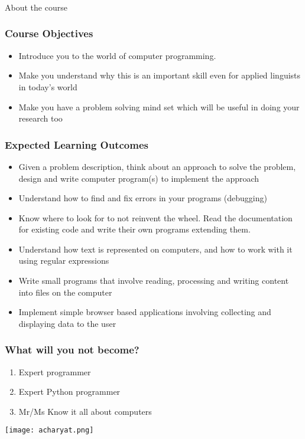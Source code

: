 \documentclass{beamer}
\begin{document}
\begin{frame}
\frametitle{}
\begin{center}
\Large About the course
\end{center}
\end{frame}

\begin{frame}
\frametitle{Course Objectives}
\begin{itemize}
\item Introduce you to the world of computer programming.
\item Make you understand why this is an important skill even for applied linguists in today's world
\item Make you have a problem solving mind set which will be useful in doing your research too
\end{itemize}
\end{frame}

\begin{frame}
\frametitle{Expected Learning Outcomes}
\begin{itemize}
\item Given a problem description, think about an approach to solve the problem, design and write computer program(s) to implement the approach
\item Understand how to find and fix errors in your programs (debugging)
\item Know where to look for to not reinvent the wheel. Read the documentation for existing code and write their own programs extending them.
\item Understand how text is represented on computers, and how to work with it using regular expressions
\item Write small programs that involve reading, processing and writing content into files on the computer
\item Implement simple browser based applications involving collecting and displaying data to the user
\end{itemize}
\end{frame}

\begin{frame}
\frametitle{What will you not become?}
\begin{enumerate}
\item Expert programmer
\item Expert Python programmer
\item Mr/Ms Know it all about computers
\end{enumerate} \pause
\texttt{[image: acharyat.png]}
\end{frame}
\end{document}
